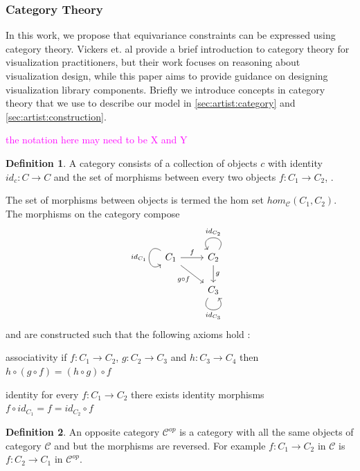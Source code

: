 \documentclass[10pt,journal,compsoc]{IEEEtran}
\newcommand{\note}[1]{\textcolor{magenta}{#1}}
\theoremstyle{definition}
\newtheorem{definition}{Definition}[section]
\theoremstyle{remark}
\begin{document}
\subsubsection{Category Theory}
\label{sec:related-work:equivariance:category}
In this work, we propose that equivariance constraints can be expressed using category theory. Vickers et. al \cite{vickersUnderstandingVisualizationFormal2013} provide a brief introduction to category theory for visualization practitioners, but their work focuses on reasoning about visualization design, while this paper aims to provide guidance on designing visualization library components. Briefly we introduce concepts in category theory that we use to describe our model in \autoref{sec:artist:category} and \autoref{sec:artist:construction}. 

\note{the notation here may need to be X and Y}

\begin{definition} A category  consists of a collection of objects $c$ with identity $id_c: C\rightarrow C$ and the set of morphisms between every two objects $f:C_1 \rightarrow C_2$, \cite{fongInvitationAppliedCategory2019,maclaneCategoriesWorkingMathematician2013}. 
\end{definition}
The set of morphisms between objects is termed the hom set $hom_{\mathcal{C}}(C_1, C_2)$. The morphisms on the category  compose
\begin{equation*}
  \begin{tikzcd}
    C_1 \arrow[r, "f"] \arrow[rd, "g\circ f"'] \arrow["id_{C_1}"', loop, distance=2em, in=215, out=145] & C_2 \arrow[d, "g"] \arrow["id_{C_2}"', loop, distance=2em, in=125, out=55] \\
  & C_3 \arrow["id_{C_3}"', loop, distance=2em, in=305, out=235]              
  \end{tikzcd}
\end{equation*}
 and are constructed such that the following axioms hold \cite{riehlCategoryTheoryContext}:
 \begin{LaTeXdescription}
   \item[associativity] if $f: C_1 \rightarrow C_2$, $g: C_2 \rightarrow C_3$ and $h: C_3 \rightarrow C_4$ then $h\circ (g \circ f) = (h \circ g) \circ f$
   \item[identity] for every $f: C_1 \rightarrow C_2$ there exists identity morphisms $f \circ id_{C_1} = f = id_{C_2} \circ f$
 \end{LaTeXdescription}

 \begin{definition} An opposite category $\mathcal{C}^{op}$ is a category with all the same objects of category $\mathcal{C}$ and but the morphisms are reversed. For example $f:C_1 \rightarrow C_2$ in $\mathcal{C}$ is $f:C_2 \rightarrow C_1$ in $\mathcal{C}^{op}$.   
 \end{definition}
\end{document}
